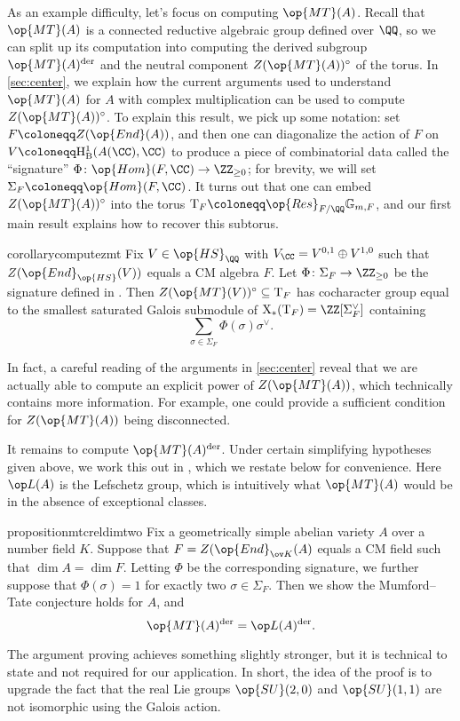 \documentclass[openany]{book}
\begin{document}
As an example difficulty, let's focus on computing $\op{MT}(A)$. Recall that $\op{MT}(A)$ is a connected reductive algebraic group defined over $\QQ$, so we can split up its computation into computing the derived subgroup $\op{MT}(A)^{\mathrm{der}}$ and the neutral component $Z(\op{MT}(A))^\circ$ of the torus. In \cref{sec:center}, we explain how the current arguments used to understand $\op{MT}(A)$ for $A$ with complex multiplication can be used to compute $Z(\op{MT}(A))^\circ$. To explain this result, we pick up some notation: set $F\coloneqq Z(\op{End}(A))$, and then one can diagonalize the action of $F$ on $V\coloneqq\mathrm H^1_{\mathrm B}(A(\CC),\CC)$ to produce a piece of combinatorial data called the ``signature'' $\Phi\colon\op{Hom}(F,\CC)\to\ZZ_{\ge0}$; for brevity, we will set $\Sigma_F\coloneqq\op{Hom}(F,\CC)$. It turns out that one can embed $Z(\op{MT}(A))^\circ$ into the torus $\mathrm T_F\coloneqq\op{Res}_{F/\QQ}\mathbb G_{m,F}$, and our first main result explains how to recover this subtorus.
\begin{restatable*}{corollary}{computezmt} \label{cor:compute-z-mt}
	Fix $V\in\op{HS}_\QQ$ with $V_\CC=V^{0,1}\oplus V^{1,0}$ such that $Z(\op{End}_{\op{HS}}(V))$ equals a CM algebra $F$. Let $\Phi\colon\Sigma_F\to\ZZ_{\ge0}$ be the signature defined in . Then $Z(\op{MT}(V))^\circ\subseteq\mathrm T_F$ has cocharacter group equal to the smallest saturated Galois submodule of $\mathrm X_*(\mathrm T_F)=\ZZ[\Sigma_F^\lor]$ containing
	\[\sum_{\sigma\in\Sigma_F}\Phi(\sigma)\sigma^\lor.\]
\end{restatable*}
\begin{remark}
	In fact, a careful reading of the arguments in \cref{sec:center} reveal that we are actually able to compute an explicit power of $Z(\op{MT}(A))$, which technically contains more information. For example, one could provide a sufficient condition for $Z(\op{MT}(A))$ being disconnected.
\end{remark}
It remains to compute $\op{MT}(A)^{\mathrm{der}}$. Under certain simplifying hypotheses given above, we work this out in , which we restate below for convenience. Here $\op L(A)$ is the Lefschetz group, which is intuitively what $\op{MT}(A)$ would be in the absence of exceptional classes.
\begin{restatable*}{proposition}{mtcreldimtwo} \label{prop:mtc-reldim-2}
	Fix a geometrically simple abelian variety $A$ over a number field $K$. Suppose that $F=Z(\op{End}_{\ov K}(A)$ equals a CM field such that $\dim A=\dim F$. Letting $\Phi$ be the corresponding signature, we further suppose that $\Phi(\sigma)=1$ for exactly two $\sigma\in\Sigma_F$. Then we show the Mumford--Tate conjecture holds for $A$, and
	\[\op{MT}(A)^{\mathrm{der}}=\op L(A)^{\mathrm{der}}.\]
\end{restatable*}
\noindent The argument proving  achieves something slightly stronger, but it is technical to state and not required for our application. In short, the idea of the proof is to upgrade the fact that the real Lie groups $\op{SU}(2,0)$ and $\op{SU}(1,1)$ are not isomorphic using the Galois action.
\end{document}
